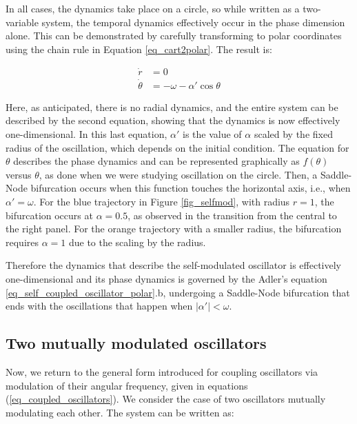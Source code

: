 \documentclass{article}
\begin{document}
In all cases, the dynamics take place on a circle, so while written as a two-variable system, the temporal dynamics effectively occur in the phase dimension alone. This can be demonstrated by carefully transforming to polar coordinates using the chain rule in Equation \ref{eq_cart2polar}. The result is:

\begin{subequations} \label{eq_self_coupled_oscillator_polar}
\begin{align} 
    \dot{r} & = 0 \\
    \dot{\theta} & = -\omega - \alpha' \cos{\theta}
\end{align}
\end{subequations}

Here, as anticipated, there is no radial dynamics, and the entire system can be described by the second equation, showing that the dynamics is now effectively one-dimensional.
In this last equation, $\alpha'$ is the value of $\alpha$ scaled by the fixed radius of the oscillation, which depends on the initial condition. 
The equation for $\theta$ describes the phase dynamics and can be represented graphically as $f(\theta)$ versus $\theta$, as done when we were studying oscillation on the circle. 
Then, a Saddle-Node bifurcation occurs when this function touches the horizontal axis, i.e., when $\alpha' = \omega$. For the blue trajectory in Figure \ref{fig_selfmod}, with radius $r = 1$, the bifurcation occurs at $\alpha = 0.5$, as observed in the transition from the central to the right panel. For the orange trajectory with a smaller radius, the bifurcation requires $\alpha = 1$ due to the scaling by the radius.

Therefore the dynamics that describe the self-modulated oscillator is effectively one-dimensional and its phase dynamics is governed by the Adler's equation \ref{eq_self_coupled_oscillator_polar}.b, undergoing a Saddle-Node bifurcation that ends with the oscillations that happen when $|\alpha'|<\omega$.


\subsection{Two mutually modulated oscillators}

Now, we return to the general form introduced for coupling oscillators via modulation of their angular frequency, given in equations (\ref{eq_coupled_oscillators}). 
We consider the case of two oscillators mutually modulating each other. The system can be written as:
\end{document}
